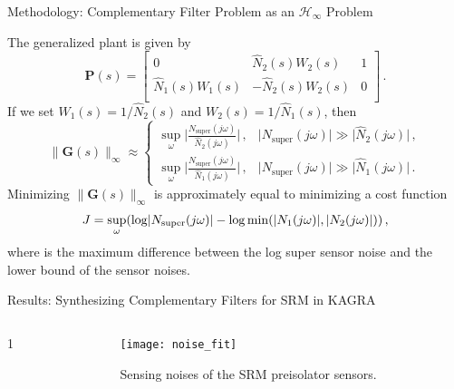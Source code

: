 \documentclass{beamer}
\begin{document}
\begin{frame}[t]
\begin{columns}[t]
\begin{column}{0.32\linewidth}
\begin{block}{Methodology: Complementary Filter Problem as an $\mathcal{H}_\infty$ Problem}
			\medskip
			
			The generalized plant is given by
			\begin{equation}
				\mathbf{P}(s) = 
				\begin{bmatrix}
					0 & \hat{N}_2(s) W_2(s) & 1 \\
					\hat{N}_1(s) W_1(s) & -\hat{N}_2(s) W_2(s) & 0 \\
				\end{bmatrix}\,.
				\label{eqn:generalized_plant_complementary_filter}
			\end{equation}
			If we set $W_1(s)=1/\hat{N}_2(s)$ and $W_2(s)=1/\hat{N}_1(s)$, then
			\begin{equation}
				\lVert \mathbf{G}(s) \rVert_\infty \approx 
				\begin{cases}
					\sup_\omega \lvert \frac{N_\mathrm{super}(j\omega)}{\hat{N}_2(j\omega)} \rvert \,, & \lvert N_\mathrm{super}(j\omega) \rvert \gg \lvert \hat{N}_2(j\omega) \rvert\,,\\
					\sup_\omega \lvert \frac{N_\mathrm{super}(j\omega)}{\hat{N}_1(j\omega)} \rvert\,, & \lvert N_\mathrm{super}(j\omega) \rvert \gg \lvert \hat{N}_1(j\omega) \rvert\,.
				\end{cases}
				\label{eqn:closed_loop_plant_complementary_filter}
			\end{equation}
			Minimizing $\lVert \mathbf{G}(s) \rVert_\infty$ is approximately equal to minimizing a cost function
			\begin{equation}
				J = \sup_\omega\mleft(\log \lvert N_\mathrm{super}(j\omega)\rvert-\log\min(\lvert N_1(j\omega) \rvert, \lvert N_2(j\omega)\rvert)\mright)\,,
			\end{equation}
			where is the maximum difference between the log super sensor noise and the lower bound of the sensor noises.
			\end{block}
			
			\begin{block}{Results: Synthesizing Complementary Filters for SRM in KAGRA}
				\begin{columns}[t, onlytextwidth]
					\begin{column}{0.55\textwidth}
						1
					\end{column}
					\begin{column}{0.45\textwidth}
						\begin{figure}
							\centering
							\texttt{[image: noise\_fit]}
							\caption{Sensing noises of the SRM preisolator sensors.}

							\label{fig:noise_fit}
						\end{figure}
					\end{column}
				\end{columns}
				

\end{block}
\end{column}
\end{columns}
\end{frame}
\end{document}
